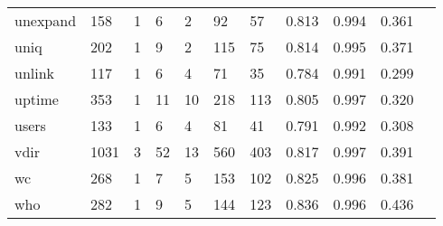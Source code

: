 \begin{longtable}{lp{1.10cm}p{1.10cm}p{1.10cm}p{1.10cm}p{1.10cm}p{1.10cm}p{1.10cm}p{1.10cm}p{1.10cm}p{1.10cm}}
unexpand  &                    158 &                                  1 &                                 6 &                                2 &                                92 &                              57 &                             0.813 &                                 0.994 &                               0.361 \\
uniq      &                    202 &                                  1 &                                 9 &                                2 &                               115 &                              75 &                             0.814 &                                 0.995 &                               0.371 \\
unlink    &                    117 &                                  1 &                                 6 &                                4 &                                71 &                              35 &                             0.784 &                                 0.991 &                               0.299 \\
uptime    &                    353 &                                  1 &                                11 &                               10 &                               218 &                             113 &                             0.805 &                                 0.997 &                               0.320 \\
users     &                    133 &                                  1 &                                 6 &                                4 &                                81 &                              41 &                             0.791 &                                 0.992 &                               0.308 \\
vdir      &                   1031 &                                  3 &                                52 &                               13 &                               560 &                             403 &                             0.817 &                                 0.997 &                               0.391 \\
wc        &                    268 &                                  1 &                                 7 &                                5 &                               153 &                             102 &                             0.825 &                                 0.996 &                               0.381 \\
who       &                    282 &                                  1 &                                 9 &                                5 &                               144 &                             123 &                             0.836 &                                 0.996 &                               0.436 \\

\end{longtable}
